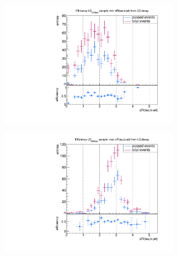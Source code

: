 \begin{figure}
  \centering
                \begin{subfigure}[t]{0.49\textwidth}
                \includegraphics[width=\textwidth]{figures/plots/LQ75/Divided_mindR_fromLQ_taubjet.pdf}
                \label{dRFromLQ:signal:taubjet:minLQ75}
                \end{subfigure}
                \begin{subfigure}[t]{0.49\textwidth}
                \includegraphics[width=\textwidth]{figures/plots/LQ75/Divided_maxdR_fromLQ_taubjet.pdf}

\end{subfigure}
\end{figure}
